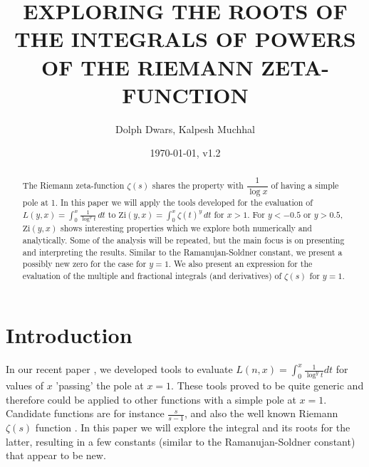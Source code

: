 \documentclass[a4paper,11pt,twoside]{amsart}
\newcommand\Zi{\mathrm{Zi}}
\begin{document}
\title[Roots of integrals of powers of the Riemann Zeta-function]{EXPLORING THE ROOTS OF THE INTEGRALS OF POWERS OF THE RIEMANN ZETA-FUNCTION}

\author{Dolph Dwars, Kalpesh Muchhal}
\date{\today, v1.2}
\address{\tt{{\it E-mail Address}: ra.dwars@quicknet.nl}}
\address{\tt{{\it E-mail Address}: kalpesh.muchhal@iitbombay.org}}

%


\begin{abstract}
The Riemann zeta-function $\zeta(s)$ shares the property with $\dfrac{1}{\log x}$ of having a simple pole at 1. In this paper we will apply the tools developed for the evaluation of $\displaystyle L(y,x) = \int_0^x \frac{1}{\log^{y} t}\, dt$ to $\displaystyle \Zi(y,x)=\int_0^x \zeta(t)^{y}\, dt$ for $x>1$. For $y < -0.5$ or $y > 0.5$, $\Zi(y,x)$ shows interesting properties which we explore both numerically and analytically. Some of the analysis will be repeated, but the main focus is on presenting and interpreting the results. Similar to the Ramanujan-Soldner constant, we present a possibly new zero for the case for $y=1$. We also present an expression for the evaluation of the multiple and fractional integrals (and derivatives) of $\zeta(s)$ for $y=1$. 
\end{abstract}

\maketitle

\section{Introduction}

In our recent paper \cite{mudw}, we developed tools to evaluate $L(n,x) = \int_0^x \frac{1}{\log^{y} t} dt$ for values of $x$ 'passing' the pole at $x=1$. These tools proved to be quite generic and therefore could be applied to other functions with a simple pole at $x=1$. Candidate functions are for instance $\frac{s}{s-1}$, and also the well known Riemann $\zeta(s)$ function \cite{edwr}. In this paper we will explore the integral and its roots for the latter, resulting in a few constants (similar to the Ramanujan-Soldner constant) that appear to be new.
\end{document}

